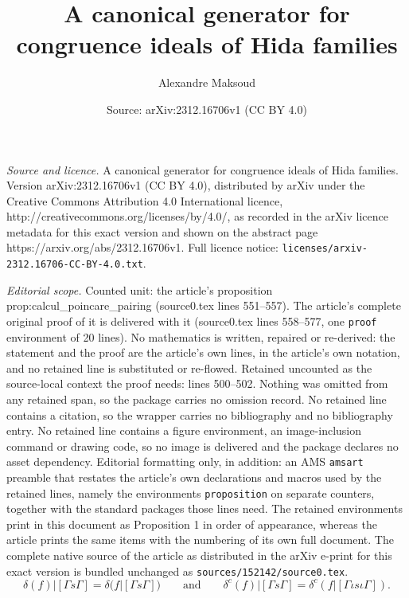 \documentclass[10pt,a4paper]{amsart}
\title{A canonical generator for congruence ideals of Hida families}
\author{Alexandre Maksoud}
\date{Source: arXiv:2312.16706v1 (CC BY 4.0)}
\begin{document}
\maketitle

\noindent\emph{Source and licence.} A canonical generator for congruence ideals of Hida families. Version arXiv:2312.16706v1 (CC BY 4.0), distributed by arXiv under the Creative Commons Attribution 4.0 International licence, http://creativecommons.org/licenses/by/4.0/, as recorded in the arXiv licence metadata for this exact version and shown on the abstract page https://arxiv.org/abs/2312.16706v1. Full licence notice: \texttt{licenses/arxiv-2312.16706-CC-BY-4.0.txt}.\par\smallskip

\noindent\textit{Editorial scope.} Counted unit: the article's proposition prop:calcul\_poincare\_pairing (source0.tex lines 551--557). The article's complete original proof of it is delivered with it (source0.tex lines 558--577, one \texttt{proof} environment of 20 lines). No mathematics is written, repaired or re-derived: the statement and the proof are the article's own lines, in the article's own notation, and no retained line is substituted or re-flowed.  Retained uncounted as the source-local context the proof needs: lines 500--502.  Nothing was omitted from any retained span, so the package carries no omission record.  No retained line contains a citation, so the wrapper carries no bibliography and no bibliography entry.  No retained line contains a figure environment, an image-inclusion command or drawing code, so no image is delivered and the package declares no asset dependency.  Editorial formatting only, in addition: an AMS \texttt{amsart} preamble that restates the article's own declarations and macros used by the retained lines, namely the environments \texttt{proposition} on separate counters, together with the standard packages those lines need.  The retained environments print in this document as Proposition 1 in order of appearance, whereas the article prints the same items with the numbering of its own full document.  The complete native source of the article as distributed in the arXiv e-print for this exact version is bundled unchanged as \texttt{sources/152142/source0.tex}.
\begin{equation}\label{eq:action_slash_cohomology}
	\delta(f)|[\Gamma s \Gamma]=\delta(f|[\Gamma s \Gamma]) \qquad \mbox{and}\qquad \delta^c(f)|[\Gamma s \Gamma]=\delta^c(f|[\Gamma \iota s\iota \Gamma]).
\end{equation}
\end{document}
